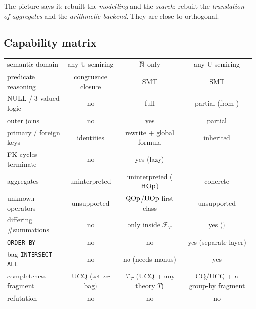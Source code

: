 \noindent The picture says it: \QED{} rebuilt the \emph{modelling} and the \emph{search};
\sqlsolver{} rebuilt the \emph{translation of aggregates} and the \emph{arithmetic backend}.
They are close to orthogonal.

\subsection{Capability matrix}

\begin{table}[h]\centering\small
\begin{tabular}{@{}lccc@{}}
\toprule
 & \udp{} & \QED{} & \sqlsolver{} \\
\midrule
semantic domain & any U-semiring & $\overline{\mathbb{N}}$ only & any U-semiring\\
predicate reasoning & congruence closure & SMT & SMT\\
NULL / 3-valued logic & \textcolor{cRed}{no} & \textcolor{cGreen}{full} & partial (from \wetune{})\\
outer joins & \textcolor{cRed}{no} & \textcolor{cGreen}{yes} & partial\\
primary / foreign keys & \textcolor{cGreen}{identities} & \textcolor{cGreen}{rewrite + global formula} & inherited\\
FK cycles terminate & \textcolor{cRed}{no} & \textcolor{cGreen}{yes (lazy)} & --\\
aggregates & uninterpreted & uninterpreted ($\mathrm{HOp}$) & \textcolor{cGreen}{concrete}\\
unknown operators & \textcolor{cRed}{unsupported} & \textcolor{cGreen}{$\mathrm{QOp}$/$\mathrm{HOp}$ first class} & \textcolor{cRed}{unsupported}\\
differing \#summations & \textcolor{cRed}{no} & only inside $\mathcal F_T$ & \textcolor{cGreen}{yes (\liastar{})}\\
\lstinline|ORDER BY| & \textcolor{cRed}{no} & \textcolor{cRed}{no} & \textcolor{cGreen}{yes (separate layer)}\\
bag \lstinline|INTERSECT ALL| & \textcolor{cRed}{no} & \textcolor{cRed}{no (needs monus)} & \textcolor{cGreen}{yes}\\
completeness fragment & UCQ (set \emph{or} bag) & $\mathcal F_T$ (UCQ + any theory $T$) & CQ/UCQ + a group-by fragment\\
refutation & \textcolor{cRed}{no} & \textcolor{cRed}{no} & \textcolor{cRed}{no}\\
\bottomrule
\end{tabular}
\end{table}

